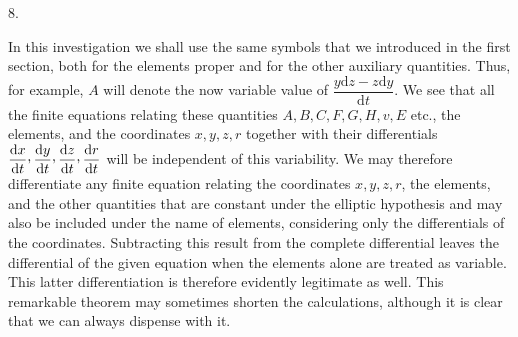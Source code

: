 \par{}\bigskip
{}
\begin{center}8.\end{center}
\noindent\hspace*{\parindent}In this investigation we shall use the same symbols that we introduced in the first section, both for the elements proper and for the other auxiliary quantities. Thus, for example, \(A\) will denote the now variable value of \(\dfrac{y\mathrm{d}z-z\mathrm{d}y}{\mathrm{d}t}\). We see that all the finite equations relating these quantities \(A,B,C,F,G,H,v,E\) etc., the elements, and the coordinates \(x,y,z,r\) together with their differentials \(\dfrac{\mathrm{d}x}{\mathrm{d}t}\mathpunct{\raisebox{.45ex}{,}}\dfrac{\mathrm{d}y}{\mathrm{d}t}\mathpunct{\raisebox{.45ex}{,}}\dfrac{\mathrm{d}z}{\mathrm{d}t}\mathpunct{\raisebox{.45ex}{,}}\dfrac{\mathrm{d}r}{\mathrm{d}t}\) will be independent of this variability. We may therefore differentiate any finite equation relating the coordinates \(x,y,z,r\), the elements, and the other quantities that are constant under the elliptic hypothesis and may also be included under the name of elements, considering only the differentials of the coordinates. Subtracting this result from the complete differential leaves the differential of the given equation when the elements alone are treated as variable. This latter differentiation is therefore evidently legitimate as well. This remarkable theorem may sometimes shorten the calculations, although it is clear that we can always dispense with it.
